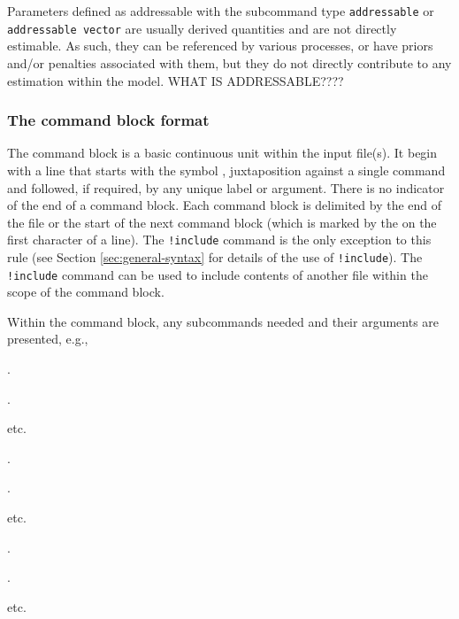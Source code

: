 Parameters defined as addressable with the subcommand type \texttt{addressable} or \texttt{addressable vector} are usually derived quantities and are not directly estimable. As such, they can be referenced by various processes, or have priors and/or penalties associated with them, but they do not directly contribute to any estimation within the model. WHAT IS ADDRESSABLE????

\subsubsection{The command block format}\label{sec:command-block-format}
The command block is a basic continuous unit within the input file(s). It begin with a line that starts with the symbol \command{}, juxtaposition against a single command and followed, if required, by any unique label or argument. There is no indicator of the end of a command block. Each command block is delimited by the end of the file or the start of the next command block (which is marked by the \command{} on the first character of a line). The \texttt{!include} command is the only exception to this rule (see Section \ref{sec:general-syntax} for details of the use of \texttt{!include}). The \texttt{!include} command can be used to include contents of another file within the scope of the command block.


Within the command block, any subcommands needed and their arguments are presented, e.g.,

\begin{multicols}{3}
	\begin{description}
		\item {}
		\item {} 
		\item {} 
		\item .
		\item .
		\item etc.
		\item {} 
		\item {} 
		\item {} 
		\item .
		\item .
		\item etc.
		\item {} 
		\item {} 
		\item {} 
		\item .
		\item .
		\item etc.
		\end{description}
	\end{multicols}

